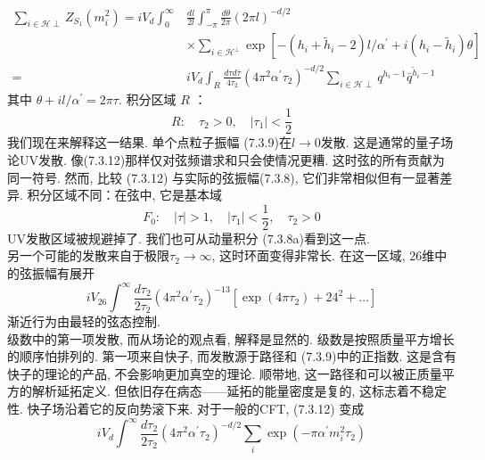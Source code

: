 \begin{equation}
	\begin{aligned}
		\sum_{i \in \mathscr{H} \perp} Z_{S_{1}}\left(m_{i}^{2}\right)=i V_{d} \int_{0}^{\infty} & \frac{d l}{2 l} \int_{-\pi}^{\pi} \frac{d \theta}{2 \pi}(2 \pi l)^{-d / 2} \\
		& \times \sum_{i \in \mathscr{H}^{\perp}} \exp \left[-\left(h_{i}+\tilde{h}_{i}-2\right) l / \alpha^{\prime}+i\left(h_{i}-\tilde{h}_{i}\right) \theta\right] \\
		=& i V_{d} \int_{R} \frac{d \tau d \bar{\tau}}{4 \tau_{2}}\left(4 \pi^{2} \alpha^{\prime} \tau_{2}\right)^{-d / 2} \sum_{i \in \mathscr{H} \perp} q^{h_{i}-1} \bar{q}^{\tilde{h}_{i}-1}
	\end{aligned}
\end{equation}
其中 $\theta+i l / \alpha^{\prime}=2 \pi \tau$. 积分区域 $R$ ：
\begin{equation}
	R: \quad \tau_{2}>0, \quad\left|\tau_{1}\right|<\frac{1}{2}
\end{equation}
我们现在来解释这一结果. 单个点粒子振幅 (7.3.9)在$l \rightarrow 0$发散. 这是通常的量子场论UV发散. 像(7.3.12)那样仅对弦频谱求和只会使情况更糟. 这时弦的所有贡献为同一符号. 然而, 比较 (7.3.12) 与实际的弦振幅(7.3.8), 它们非常相似但有一显著差异. 积分区域不同：在弦中, 它是基本域
\begin{equation}
	F_{0}: \quad|\tau|>1, \quad\left|\tau_{1}\right|<\frac{1}{2}, \quad \tau_{2}>0
\end{equation}
UV发散区域被规避掉了. 我们也可从动量积分 (7.3.8a)看到这一点. \\
另一个可能的发散来自于极限$\tau_{2} \rightarrow \infty$, 这时环面变得非常长. 在这一区域, 26维中的弦振幅有展开
\begin{equation}
	i V_{26} \int^{\infty} \frac{d \tau_{2}}{2 \tau_{2}}\left(4 \pi^{2} \alpha^{\prime} \tau_{2}\right)^{-13}\left[\exp \left(4 \pi \tau_{2}\right)+24^{2}+\ldots\right]
\end{equation}
渐近行为由最轻的弦态控制.\\
级数中的第一项发散, 而从场论的观点看, 解释是显然的. 级数是按照质量平方增长的顺序怕排列的. 第一项来自快子, 而发散源于路径和 (7.3.9)中的正指数. 这是含有快子的理论的产品, 不会影响更加真空的理论. 顺带地, 这一路径和可以被正质量平方的解析延拓定义. 但依旧存在病态——延拓的能量密度是复的, 这标志着不稳定性. 快子场沿着它的反向势滚下来. 对于一般的CFT, (7.3.12) 变成
\begin{equation}
	i V_{d} \int^{\infty} \frac{d \tau_{2}}{2 \tau_{2}}\left(4 \pi^{2} \alpha^{\prime} \tau_{2}\right)^{-d / 2} \sum_{i} \exp \left(-\pi \alpha^{\prime} m_{i}^{2} \tau_{2}\right)
\end{equation}
